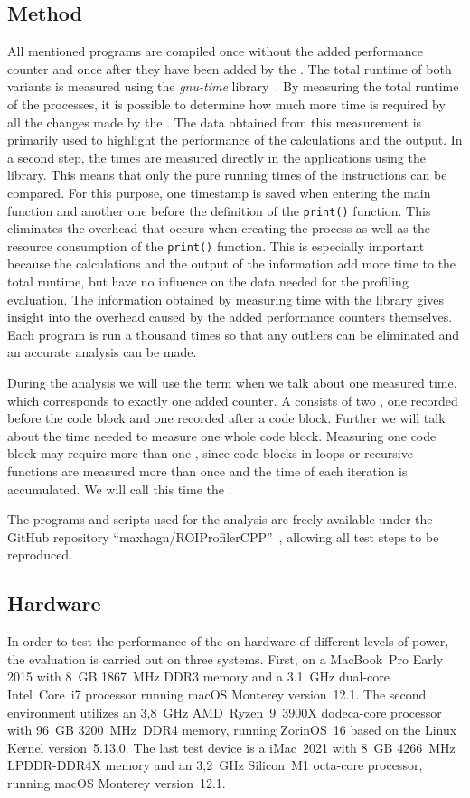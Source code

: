 \subsection{Method}
All mentioned programs are compiled once without the added performance counter and once after they have been added by the \TOOL. The total runtime of both variants is measured using the \emph{gnu-time} library~\cite{Gtime}. By measuring the total runtime of the processes, it is possible to determine how much more time is required by all the changes made by the \TOOL. The data obtained from this measurement is primarily used to highlight the performance of the calculations and the output. In a second step, the times are measured directly in the \CPP applications using the \CHRONO library. This means that only the pure running times of the instructions can be compared. For this purpose, one timestamp is saved when entering the main function and another one before the definition of the \lstinline{print()} function. This eliminates the overhead that occurs when creating the process as well as the resource consumption of the \lstinline{print()} function. This is especially important because the calculations and the output of the information add more time to the total runtime, but have no influence on the data needed for the profiling evaluation. The information obtained by measuring time with the \CHRONO library gives insight into the overhead caused by the added performance counters themselves. Each program is run a thousand times so that any outliers can be eliminated and an accurate analysis can be made. 

During the analysis we will use the term \MEASUREVALUE when we talk about one measured time, which corresponds to exactly one added counter. A \MEASUREPAIR consists of two \MEASUREVALUES, one recorded before the code block and one recorded after a code block. Further we will talk about the time needed to measure one whole code block. Measuring one code block may require more than one \MEASUREPAIR, since code blocks in loops or recursive functions are measured more than once and the time of each iteration is accumulated. We will call this time the \TOTALCODEBLOCK. 

The programs and scripts used for the analysis are freely available under the GitHub repository ``maxhagn/ROIProfilerCPP''~\cite{ROIPROFILER}, allowing all test steps to be reproduced.

\subsection{Hardware}
In order to test the performance of the \TOOL on hardware of different levels of power, the evaluation is carried out on three systems. First, on a MacBook~Pro Early 2015 with 8~GB 1867~MHz DDR3 memory and a 3.1~GHz dual-core Intel~Core~i7 processor running macOS Monterey version~12.1. The second environment utilizes an 3,8~GHz AMD~Ryzen~9~3900X dodeca-core processor with 96~GB 3200~MHz~DDR4 memory, running ZorinOS~16 based on the Linux Kernel version~5.13.0. The last test device is a iMac~2021 with 8~GB 4266~MHz LPDDR-DDR4X memory and an 3,2~GHz Silicon~M1 octa-core processor, running macOS Monterey version~12.1.

